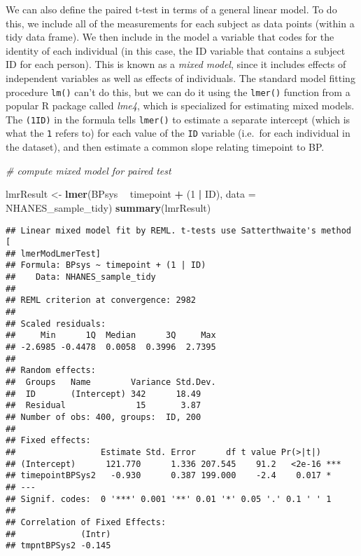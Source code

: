 \documentclass[]{book}
\newenvironment{Shaded}{\begin{snugshade}}{\end{snugshade}}
\newcommand{\KeywordTok}[1]{\textcolor[rgb]{0.13,0.29,0.53}{\textbf{#1}}}
\newcommand{\DataTypeTok}[1]{\textcolor[rgb]{0.13,0.29,0.53}{#1}}
\newcommand{\DecValTok}[1]{\textcolor[rgb]{0.00,0.00,0.81}{#1}}
\newcommand{\StringTok}[1]{\textcolor[rgb]{0.31,0.60,0.02}{#1}}
\newcommand{\CommentTok}[1]{\textcolor[rgb]{0.56,0.35,0.01}{\textit{#1}}}
\newcommand{\OperatorTok}[1]{\textcolor[rgb]{0.81,0.36,0.00}{\textbf{#1}}}
\newcommand{\NormalTok}[1]{#1}
\theoremstyle{definition}
\theoremstyle{definition}
\theoremstyle{definition}
\theoremstyle{remark}
\begin{document}
We can also define the paired t-test in terms of a general linear model.
To do this, we include all of the measurements for each subject as data
points (within a tidy data frame). We then include in the model a
variable that codes for the identity of each individual (in this case,
the ID variable that contains a subject ID for each person). This is
known as a \emph{mixed model}, since it includes effects of independent
variables as well as effects of individuals. The standard model fitting
procedure \texttt{lm()} can't do this, but we can do it using the
\texttt{lmer()} function from a popular R package called \emph{lme4},
which is specialized for estimating mixed models. The
\texttt{(1\textbar{}ID)} in the formula tells \texttt{lmer()} to
estimate a separate intercept (which is what the \texttt{1} refers to)
for each value of the \texttt{ID} variable (i.e.~for each individual in
the dataset), and then estimate a common slope relating timepoint to BP.

\begin{Shaded}
\begin{Highlighting}[]
\CommentTok{# compute mixed model for paired test}

\NormalTok{lmrResult <-}\StringTok{ }\KeywordTok{lmer}\NormalTok{(BPsys }\OperatorTok{~}\StringTok{ }\NormalTok{timepoint }\OperatorTok{+}\StringTok{ }\NormalTok{(}\DecValTok{1} \OperatorTok{|}\StringTok{ }\NormalTok{ID), }\DataTypeTok{data =}\NormalTok{ NHANES_sample_tidy)}
\KeywordTok{summary}\NormalTok{(lmrResult)}
\end{Highlighting}
\end{Shaded}

\begin{verbatim}
## Linear mixed model fit by REML. t-tests use Satterthwaite's method [
## lmerModLmerTest]
## Formula: BPsys ~ timepoint + (1 | ID)
##    Data: NHANES_sample_tidy
## 
## REML criterion at convergence: 2982
## 
## Scaled residuals: 
##     Min      1Q  Median      3Q     Max 
## -2.6985 -0.4478  0.0058  0.3996  2.7395 
## 
## Random effects:
##  Groups   Name        Variance Std.Dev.
##  ID       (Intercept) 342      18.49   
##  Residual              15       3.87   
## Number of obs: 400, groups:  ID, 200
## 
## Fixed effects:
##                 Estimate Std. Error      df t value Pr(>|t|)    
## (Intercept)      121.770      1.336 207.545    91.2   <2e-16 ***
## timepointBPSys2   -0.930      0.387 199.000    -2.4    0.017 *  
## ---
## Signif. codes:  0 '***' 0.001 '**' 0.01 '*' 0.05 '.' 0.1 ' ' 1
## 
## Correlation of Fixed Effects:
##             (Intr)
## tmpntBPSys2 -0.145
\end{verbatim}
\end{document}
